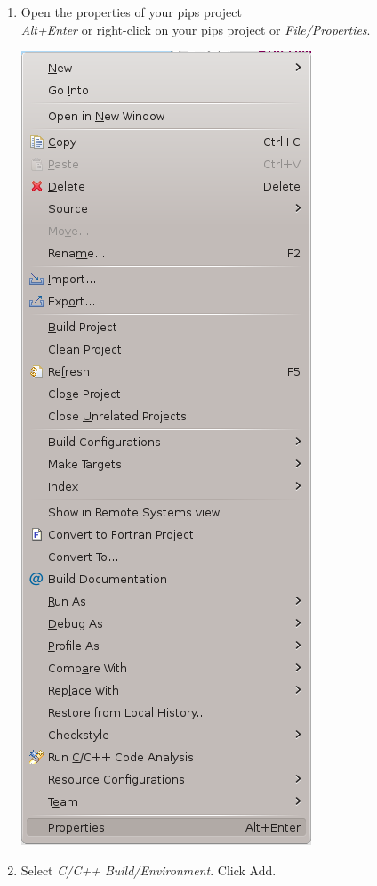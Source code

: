 \documentclass[a4paper]{article}
\begin{document}
\begin{enumerate}
\begin{enumerate}
\item Open the properties of your pips project \\
\emph{Alt+Enter} or right-click on your pips project or \emph{File/Properties}.
\begin{center}
\noindent
\includegraphics[scale=0.4]{eclipse/05-eclipseJUNO-addPath1.png}
\end{center}

\item Select \emph{C/C++ Build/Environment}. Click Add.


\end{enumerate}
\end{enumerate}
\end{document}
